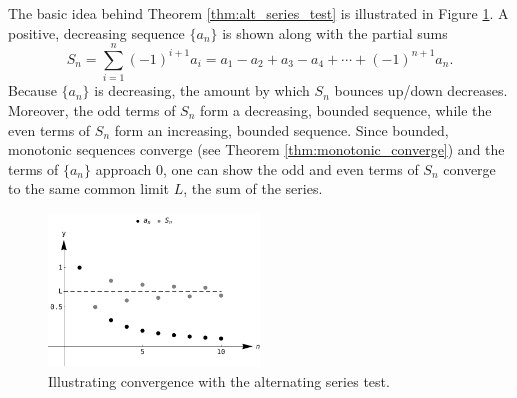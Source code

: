 \fi

\ifcalculus
The basic idea behind Theorem \ref{thm:alt_series_test} is illustrated in Figure \ref{fig_series_12}. A positive, decreasing sequence $\{a_n\}$ is shown along with the partial sums
$$S_n = \sum_{i=1}^n(-1)^{i+1}a_i =a_1-a_2+a_3-a_4+\cdots+(-1)^{n+1}a_n.$$ 
Because $\{a_n\}$ is decreasing, the amount by which $S_n$ bounces up/down decreases. Moreover, the odd terms of $S_n$ form a decreasing, bounded sequence, while the even terms of $S_n$ form an increasing, bounded sequence. Since bounded, monotonic sequences converge (see Theorem \ref{thm:monotonic_converge}) and the terms of $\{a_n\}$ approach 0, one can show the odd and even terms of $S_n$ converge to the same common limit $L$, the sum of the series.


\begin{figure}
	\begin{center}
			\includegraphics[width=0.5\textwidth]{fig_series_12}
	\caption{Illustrating convergence with the alternating series test.}
	\label{fig_series_12}
	\end{center}
\end{figure}


\fi

